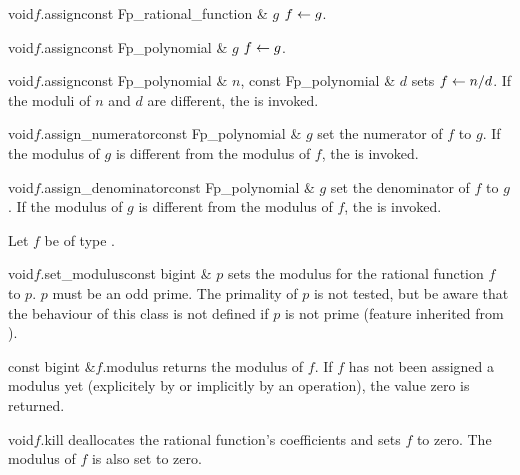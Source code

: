 \begin{fcode}{void}{$f$.assign}{const Fp_rational_function & $g$}
  $f \leftarrow g$.
\end{fcode}

\begin{fcode}{void}{$f$.assign}{const Fp_polynomial & $g$}
  $f \leftarrow g$.
\end{fcode}

\begin{fcode}{void}{$f$.assign}{const Fp_polynomial & $n$, const Fp_polynomial & $d$}
  sets $f \leftarrow n / d$.  If the moduli of $n$ and $d$ are different, the \LEH is invoked.
\end{fcode}

\begin{fcode}{void}{$f$.assign_numerator}{const Fp_polynomial & $g$}
  set the numerator of $f$ to $g$.  If the modulus of $g$ is different from the modulus of $f$,
  the \LEH is invoked.
\end{fcode}

\begin{fcode}{void}{$f$.assign_denominator}{const Fp_polynomial & $g$}
  set the denominator of $f$ to $g$.  If the modulus of $g$ is different from the modulus of
  $f$, the \LEH is invoked.
\end{fcode}



\BASIC

Let $f$ be of type .

\begin{fcode}{void}{$f$.set_modulus}{const bigint & $p$}
  sets the modulus for the rational function $f$ to $p$.  $p$ must be an odd prime.  The
  primality of $p$ is not tested, but be aware that the behaviour of this class is not defined
  if $p$ is not prime (feature inherited from ).
\end{fcode}

\begin{cfcode}{const bigint &}{$f$.modulus}{}
  returns the modulus of $f$.  If $f$ has not been assigned a modulus yet (explicitely by
   or implicitly by an operation), the value zero is returned.
\end{cfcode}

\begin{fcode}{void}{$f$.kill}{}
  deallocates the rational function's coefficients and sets $f$ to zero.  The modulus of $f$ is
  also set to zero.
\end{fcode}


